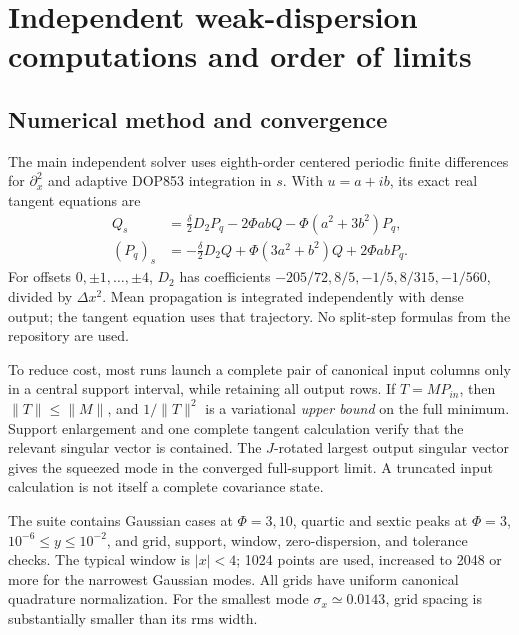 \documentclass[11pt,a4paper]{article}
\begin{document}
\section{Independent weak-dispersion computations and order of limits}

\subsection{Numerical method and convergence}

The main independent solver uses eighth-order centered periodic finite differences for $\partial_x^2$ and adaptive DOP853 integration in $s$. With $u=a+ib$, its exact real tangent equations are
\begin{align}
Q_s&=\frac\delta2D_2P_q-2\Phi abQ-\Phi(a^2+3b^2)P_q,\\
(P_q)_s&=-\frac\delta2D_2Q+\Phi(3a^2+b^2)Q+2\Phi abP_q.
\end{align}
For offsets $0,\pm1,\ldots,\pm4$, $D_2$ has coefficients $-205/72,8/5,-1/5,8/315,-1/560$, divided by $\Delta x^2$. Mean propagation is integrated independently with dense output; the tangent equation uses that trajectory. No split-step formulas from the repository are used.

To reduce cost, most runs launch a complete pair of canonical input columns only in a central support interval, while retaining all output rows. If $T=MP_{in}$, then $\|T\|\le\|M\|$, and $1/\|T\|^2$ is a variational \emph{upper bound} on the full minimum. Support enlargement and one complete tangent calculation verify that the relevant singular vector is contained. The $J$-rotated largest output singular vector gives the squeezed mode in the converged full-support limit. A truncated input calculation is not itself a complete covariance state.

The suite contains Gaussian cases at $\Phi=3,10$, quartic and sextic peaks at $\Phi=3$, $10^{-6}\le y\le10^{-2}$, and grid, support, window, zero-dispersion, and tolerance checks. The typical window is $|x|<4$; 1024 points are used, increased to 2048 or more for the narrowest Gaussian modes. All grids have uniform canonical quadrature normalization. For the smallest mode $\sigma_x\simeq0.0143$, grid spacing is substantially smaller than its rms width.
\end{document}
